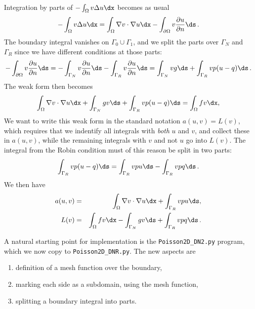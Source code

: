 Integration by parts of $-\int_\Omega v\Delta u\dx$ becomes
as usual
\[
 -\int_\Omega v\Delta u \dx
= \int_\Omega\nabla v\cdot\nabla u\dx - \int_{\partial\Omega}v{\partial u\over
\partial n}\ds\langtangenep
\]
The boundary integral vanishes on $\Gamma_0\cup\Gamma_1$, and
we split the parts over $\Gamma_N$ and $\Gamma_R$ since we have
different conditions at those parts:
\[
- \int_{\partial\Omega}v{\partial u\over
\partial n}\ds
=
-\int_{\Gamma_N}v{\partial u\over
\partial n}\ds -
\int_{\Gamma_R}v{\partial u\over
\partial n}\ds
= \int_{\Gamma_N}vg\ds +
\int_{\Gamma_R}vp(u-q)\ds\langtangenep
\]
The weak form then becomes
\[
\int_{\Omega} \nabla v \cdot \nabla u \dx +
\int_{\Gamma_N} g v\ds + \int_{\Gamma_R}vp(u-q)\ds
= \int_{\Omega} fv \dx,
\]
We want to write this weak form in the standard
notation $a(u,v)=L(v)$, which
requires that we indentify all integrals with \emph{both} $u$ and $v$,
and collect these in $a(u,v)$, while the remaining integrals with
$v$ and not $u$ go
into $L(v)$.
The integral from the Robin condition must of this reason be split in two
parts:
\[ \int_{\Gamma_R}vp(u-q)\ds
= \int_{\Gamma_R}vpu\ds - \int_{\Gamma_R}vpq\ds\langtangenep
\]
We then have
\begin{eqnarray}
a(u, v) &=& \int_{\Omega} \nabla v \cdot \nabla u \dx
+ \int_{\Gamma_R}vpu\ds,
\label{langtangen:poisson:2D:DN3:var:a}\\
L(v) &=& \int_{\Omega} fv \dx -
\int_{\Gamma_N} g v\ds + \int_{\Gamma_R}vpq\ds\langtangenep
\label{langtangen:poisson:2D:DN3:var:L}
\end{eqnarray}

A natural starting point for implementation is
the {\fontsize{12pt}{12pt}\verb!Poisson2D_DN2.py!} program, which we now copy to
{\fontsize{12pt}{12pt}\verb!Poisson2D_DNR.py!}.
The new aspects are
\begin{enumerate}
\item definition of a mesh function over the boundary,
\item marking each side as a subdomain, using the mesh function,
\item splitting a boundary integral into parts.
\end{enumerate}

